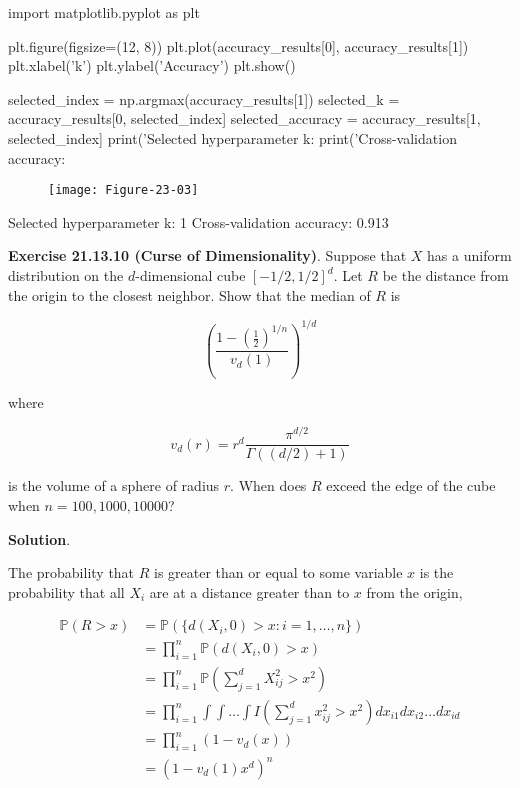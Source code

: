 \begin{python}
import matplotlib.pyplot as plt

plt.figure(figsize=(12, 8))
plt.plot(accuracy_results[0], accuracy_results[1])
plt.xlabel('k')
plt.ylabel('Accuracy')
plt.show()

selected_{i}ndex = np.argmax(accuracy_results[1])
selected_{k} = accuracy_results[0, selected_{i}ndex]
selected_accuracy = accuracy_results[1, selected_{i}ndex]
print('Selected hyperparameter k: %
print('Cross-validation accuracy: %
\end{python}

\begin{figure}[H]
\centering
\texttt{[image: Figure-23-03]}
\end{figure}

\begin{console}
Selected hyperparameter k: 1
Cross-validation accuracy: 0.913
\end{console}

\textbf{Exercise 21.13.10 (Curse of Dimensionality)}. Suppose that \(X\)
has a uniform distribution on the \(d\)-dimensional cube
\([-1/2, 1/2]^{d}\). Let \(R\) be the distance from the origin to the
closest neighbor. Show that the median of \(R\) is

\[ \left( \frac{1 - \left(\frac{1}{2}\right)^{1/n}}{v_d(1)} \right)^{1/d}\]

where

\[ v_d(r) = r^{d} \frac{\pi^{d/2}}{\Gamma((d/2) + 1)} \]

is the volume of a sphere of radius \(r\). When does \(R\) exceed the
edge of the cube when \(n = 100, 1000, 10000\)?

\textbf{Solution}.

The probability that \(R\) is greater than or equal to some variable
\(x\) is the probability that all \(X_{i}\) are at a distance greater than
to \(x\) from the origin,

\begin{align*}
\mathbb{P}(R > x) &= \mathbb{P}(\{ d(X_{i}, 0) > x : i = 1, \dots, n \}) \\
&= \prod_{i=1}^{n} \mathbb{P}( d(X_{i}, 0) > x  ) \\
&= \prod_{i=1}^{n} \mathbb{P}\left( \sum_{j=1}^{d} X_{ij}^{2} > x^{2}  \right) \\
&= \prod_{i=1}^{n} \int \int \dots \int I \left( \sum_{j=1}^{d} x_{ij}^{2} > x^{2} \right) dx_{i1} dx_{i2} \dots dx_{id} \\
&= \prod_{i=1}^{n} (1 - v_d(x)) \\
&= \left(1 - v_d(1) x^{d}\right)^{n}
\end{align*}

